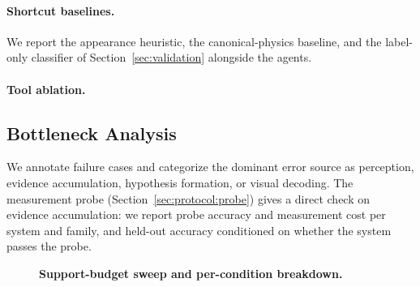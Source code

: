 \paragraph{Shortcut baselines.} We report the appearance heuristic, the canonical-physics baseline, and the label-only classifier of Section~\ref{sec:validation} alongside the agents. 

\paragraph{Tool ablation.} 

\subsection{Bottleneck Analysis}

We annotate failure cases and categorize the dominant error source as perception, evidence accumulation, hypothesis formation, or visual decoding. The measurement probe (Section~\ref{sec:protocol:probe}) gives a direct check on evidence accumulation: we report probe accuracy and measurement cost per system and family, and held-out accuracy conditioned on whether the system passes the probe.  

\begin{figure}[t]
  \centering
  \caption{\textbf{Support-budget sweep and per-condition breakdown.} }
  \label{fig:budget}
\end{figure}
